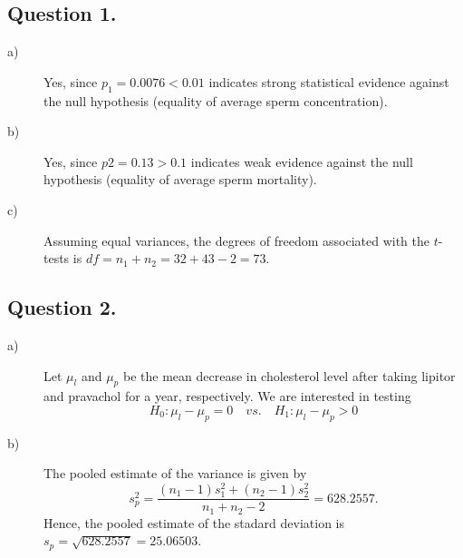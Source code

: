 \documentclass{article}\usepackage[]{graphicx}\usepackage[]{color}
\begin{document}
\begin{description}

\subsection*{Question 1.}
  
\begin{description}
  
  \item[a)] Yes, since $p_1 = 0.0076 < 0.01$ indicates strong statistical evidence against the null hypothesis (equality of average sperm concentration).
    
  \item[b)] Yes, since $p2 = 0.13 > 0.1$ indicates weak evidence against the null hypothesis (equality of average sperm mortality).
    
  \item[c)] Assuming equal variances, the degrees of freedom associated with the $t$-tests is $df = n_1 + n_2 = 32 + 43 - 2 = 73$.
    
\end{description}

  
\subsection*{Question 2.}

\begin{description}
  
  \item[a)] Let $\mu_l$ and $\mu_p$ be the mean decrease in cholesterol level after taking lipitor and pravachol for a year, respectively. We are interested in testing 
  \begin{equation*}
    H_0: \mu_l -\mu_p = 0 \quad vs. \quad H_1: \mu_l - \mu_p > 0
  \end{equation*}
    
  \item[b)] The pooled estimate of the variance is given by
  \begin{equation*}
    s_p^2 = \frac{\left(n_1 - 1\right)s_1^2 + \left(n_2 - 1\right)s_2^2}{n_1 + n_2 - 2} = 628.2557.
  \end{equation*}
  Hence, the pooled estimate of the stadard deviation is $s_p = \sqrt{628.2557} = 25.06503$.
    

\end{description}
\end{description}
\end{document}

